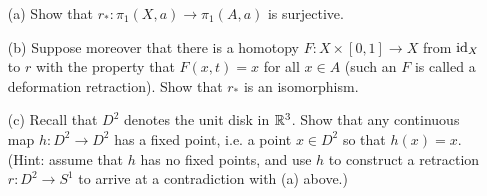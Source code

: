 \begin{enumerate}[label=4.\arabic*]
    \begin{itemize}
      \item[(a)] Show that $r_* : \pi_1(X,a) \to \pi_1(A,a)$ is surjective.
      \item[(b)] Suppose moreover that there is a homotopy $F : X \times [0,1] \to X$ from $\mathrm{id}_X$ to $r$ with the property that $F(x,t) = x$ for all $x \in A$ (such an $F$ is called a deformation retraction). Show that $r_*$ is an isomorphism.
      \item[(c)] Recall that $D^2$ denotes the unit disk in $\mathbb{R}^3$. Show that any continuous map $h : D^2 \to D^2$ has a fixed point, i.e. a point $x \in D^2$ so that $h(x) = x$. (Hint: assume that $h$ has no fixed points, and use $h$ to construct a retraction $r : D^2 \to S^1$ to arrive at a contradiction with (a) above.)
    \end{itemize}
\end{enumerate}
